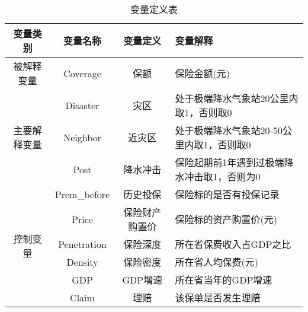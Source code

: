 \begin{table}[H]
    \caption{变量定义表}\label{tab:var}
    \centering
    \begin{tabularx}{\textwidth}{
        ccc>{\centering\arraybackslash}X
         }
        \toprule
        变量类别                    & 变量名称         & 变量定义    & 变量解释                \\ \midrule
        被解释变量                   & Coverage     & 保额      & 保险金额(元)                \\ \midrule
        \multirow{3}{*}{主要解释变量} & Disaster     & 灾区      & 处于极端降水气象站20公里内取1，否则取0    \\ \cmidrule(l){2-4}
                                & Neighbor     & 近灾区     & 处于极端降水气象站20-50公里内取1，否则取0 \\ \cmidrule(l){2-4}
                                & Post         & 降水冲击  & 保险起期前1年遇到过极端降水冲击取1，否则为0 \\
        \midrule
        \multirow{6}{*}{控制变量}   & Prem\_before & 历史投保    & 保险标的是否有投保记录         \\ \cmidrule(l){2-4}
                                & Price        & 保险财产购置价 & 保险标的资产购置价(元)           \\ \cmidrule(l){2-4}
                                & Penetration         & 保险深度    & 所在省保费收入占GDP之比            \\ \cmidrule(l){2-4}
                                & Density         & 保险密度    & 所在省人均保费(元)           \\ \cmidrule(l){2-4}
                                & GDP         & GDP增速    & 所在省当年的GDP增速           \\ \cmidrule(l){2-4}
        & Claim       & 理赔    & 该保单是否发生理赔            \\
        \bottomrule
    \end{tabularx}
\end{table}

